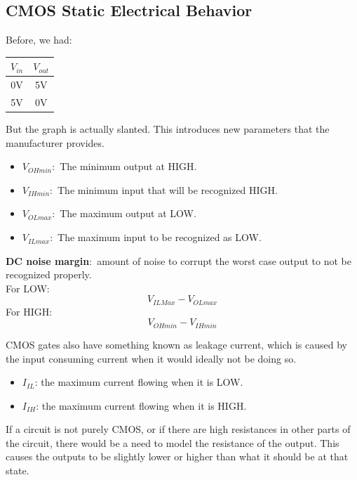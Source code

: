 \documentclass[nobib]{tufte-handout}
\newcommand{\defn}[2]{\noindent\textbf{#1}:\ #2}
\begin{document}
\subsection{CMOS Static Electrical Behavior}
Before, we had:
\begin{table}
    \centering
    \begin{tabular}{c|c}
        $V_{in}$ & $V_{out}$ \\
        \hline
        0V       & 5V        \\
        5V       & 0V
    \end{tabular}
\end{table}
But the graph is actually slanted. This introduces new parameters that the manufacturer provides.\\
\begin{itemize}
    \item \defn{$V_{OHmin}$}{The minimum output at HIGH.}
    \item \defn{$V_{IHmin}$}{The minimum input that will be recognized HIGH.}
    \item \defn{$V_{OLmax}$}{The maximum output at LOW.}
    \item \defn{$V_{ILmax}$}{The maximum input to be recognized as LOW.}
\end{itemize}
\defn{DC noise margin}{amount of noise to corrupt the worst case output to not be recognized properly.\\
    \quad For LOW:
    \begin{equation*}
        V_{ILMax} - V_{OLmax}
    \end{equation*}
    \quad For HIGH:
    \begin{equation*}
        V_{OHmin} - V_{IHmin}
    \end{equation*}
}
CMOS gates also have something known as leakage current, which is caused by the input consuming current when it would ideally not be doing so.\\
\begin{itemize}
    \item $I_{IL}$: the maximum current flowing when it is LOW.
    \item $I_{IH}$: the maximum current flowing when it is HIGH.
\end{itemize}
If a circuit is not purely CMOS, or if there are high resistances in other parts of the circuit, there would be a need to model the resistance of the output.
This causes the outputs to be slightly lower or higher than what it should be at that state.\\
\end{document}
